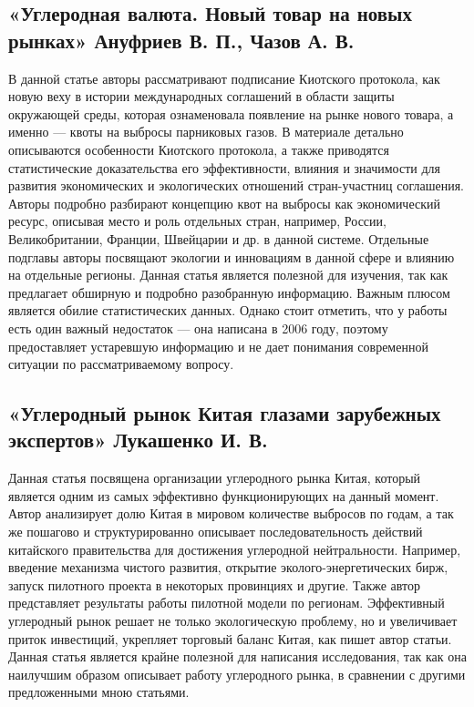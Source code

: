 \documentclass[a4paper,14pt]{article}
\begin{document}
\subsection{«Углеродная валюта. Новый товар на новых рынках» Ануфриев В. П., Чазов А. В.}
В данной статье авторы рассматривают подписание Киотского протокола, как новую веху в истории международных соглашений в области защиты окружающей среды, которая ознаменовала появление на рынке нового товара, а именно — квоты на выбросы парниковых газов. В материале детально описываются особенности Киотского протокола, а также приводятся статистические доказательства его эффективности, влияния и значимости для развития экономических и экологических отношений стран-участниц соглашения. Авторы подробно разбирают концепцию квот на выбросы как экономический ресурс, описывая место и роль отдельных стран, например, России, Великобритании, Франции, Швейцарии и др. в данной системе. Отдельные подглавы авторы посвящают экологии и инновациям в данной сфере и влиянию на отдельные регионы. Данная статья является полезной для изучения, так как предлагает обширную и подробно разобранную информацию. Важным плюсом является обилие статистических данных. Однако стоит отметить, что у работы есть один важный недостаток — она написана в 2006 году, поэтому предоставляет устаревшую информацию и не дает понимания современной ситуации по рассматриваемому вопросу.
\subsection{«Углеродный рынок Китая глазами зарубежных экспертов» Лукашенко И. В.}
Данная статья посвящена организации углеродного рынка Китая, который является одним из самых эффективно функционирующих на данный момент. Автор анализирует долю Китая в мировом количестве выбросов по годам, а так же пошагово и структурированно описывает последовательность действий китайского правительства для достижения углеродной нейтральности. Например, введение механизма чистого развития, открытие эколого-энергетических бирж, запуск пилотного проекта в некоторых провинциях и другие. Также автор представляет результаты работы пилотной модели по регионам.  Эффективный углеродный рынок решает не только экологическую проблему, но и увеличивает приток инвестиций, укрепляет торговый баланс Китая, как пишет автор статьи. Данная статья является крайне полезной для написания исследования, так как она наилучшим образом описывает работу углеродного рынка, в сравнении с другими предложенными мною статьями.
\end{document}

